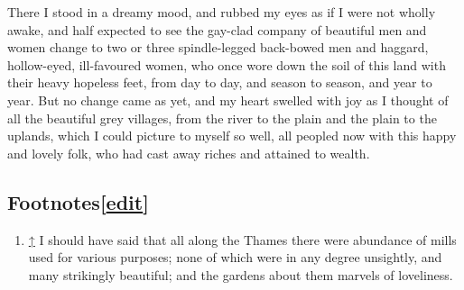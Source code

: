 There I stood in a dreamy mood, and rubbed my eyes as if I were not
wholly awake, and half expected to see the gay-clad company of beautiful
men and women change to two or three spindle-legged back-bowed men and
haggard, hollow-eyed, ill-favoured women, who once wore down the soil of
this land with their heavy hopeless feet, from day to day, and season to
season, and year to year. But no change came as yet, and my heart
swelled with joy as I thought of all the beautiful grey villages, from
the river to the plain and the plain to the uplands, which I could
picture to myself so well, all peopled now with this happy and lovely
folk, who had cast away riches and attained to wealth.

\hypertarget{footnotesedit}{%
\subsection[{{{[}}\href{/w/index.php?title=News_from_Nowhere/Chapter_XXX\&action=edit\&section=1}{edit}{{]}}}]{\texorpdfstring{\protect\hypertarget{Footnotes}{}{Footnotes}{{{[}}\href{/w/index.php?title=News_from_Nowhere/Chapter_XXX\&action=edit\&section=1}{edit}{{]}}}}{Footnotes{[}edit{]}}}\label{footnotesedit}}

\begin{enumerate}
\tightlist
\item
  \protect\hypertarget{cite_note-1}{}{{\protect\hyperlink{cite_ref-1}{↑}}
  {I should have said that all along the Thames there were abundance of
  mills used for various purposes; none of which were in any degree
  unsightly, and many strikingly beautiful; and the gardens about them
  marvels of loveliness.}}
\end{enumerate}
